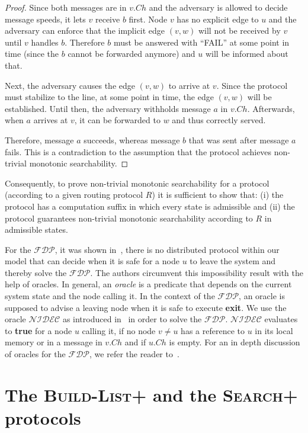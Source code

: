 \documentclass[a4paper,USenglish]{lipics}
\newcommand{\blp}{\textsc{Build-List+}\xspace}
\newcommand{\srp}{\textsc{Search+}\xspace}
\newcommand{\fdp}{$\mathcal{FDP}$\xspace}
\newcommand{\nidec}{$\mathcal{NIDEC}$\xspace}
\begin{document}
\begin{proof}
 Since both messages are in $v.Ch$ and the adversary is allowed to decide message speeds, it lets $v$ receive $b$ first.
 Node $v$ has no explicit edge to $u$ and the adversary can enforce that the implicit edge $(v,w)$ will not be received by $v$ until $v$ handles $b$. Therefore $b$ must be answered with ``FAIL'' at some point in time (since the $b$ cannot be forwarded anymore) and $u$ will be informed about that.

 Next, the adversary causes the edge $(v,w)$ to arrive at $v$.
 Since the protocol must stabilize to the line, at some point in time, the edge $(v,w)$ will be established.
 Until then, the adversary withholds message $a$ in $v.Ch$.
 Afterwards, when $a$ arrives at $v$, it can be forwarded to $w$ and thus correctly served.
 
 Therefore, message $a$ succeeds, whereas message $b$ that was sent after message $a$ fails.
 This is a contradiction to the assumption that the protocol achieves non-trivial monotonic searchability. 
\end{proof}


Consequently, to prove non-trivial monotonic searchability for a protocol (according to a given routing protocol $R$) it is sufficient to show that: (i) the protocol has a computation suffix in which every state is admissible and (ii) the protocol guarantees non-trivial monotonic searchability according to $R$ in admissible states.

For the \fdp, it was shown in~\cite{departure1}, there is no distributed protocol within our model that can decide when it is safe for a node $u$ to leave the system and thereby solve the \fdp.
The authors circumvent this impossibility result with the help of oracles.
In general, an \emph{oracle} is a predicate that depends on the current system state and the node calling it. 
In the context of the \fdp, an oracle is supposed to advise a leaving node when it is safe to execute \textbf{exit}.
We use the oracle \nidec as introduced in~\cite{departure1} in order to solve the \fdp. 
\nidec evaluates to \textbf{true} for a node $u$ calling it, if no node $v \neq u$ has a reference to $u$ in its local memory or in a message in $v.Ch$ and if $u.Ch$ is empty. For an in depth discussion of oracles for the \fdp, we refer the reader to~\cite{departure1,KoutsopoulosSS15}. 


\section{The \blp and the \srp protocols}
\label{sec:blpAlgorithm}
\end{document}
